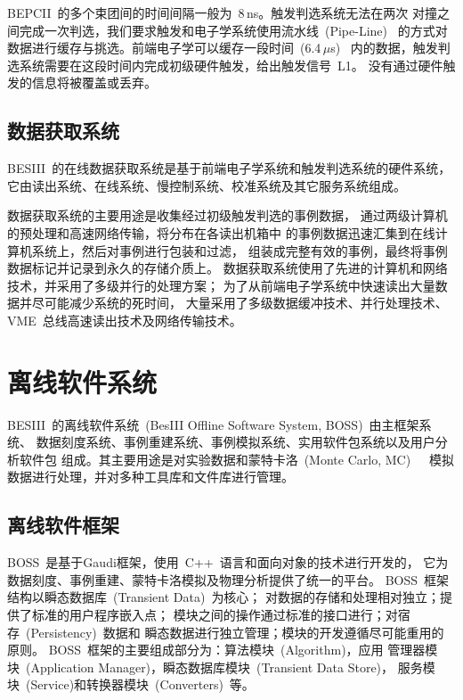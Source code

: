 BEPCII~的多个束团间的时间间隔一般为~8\,ns。触发判选系统无法在两次
对撞之间完成一次判选，我们要求触发和电子学系统使用流水线~(Pipe-Line)~
的方式对数据进行缓存与挑选。前端电子学可以缓存一段时间~(6.4\,$\mu$s)~
内的数据，触发判选系统需要在这段时间内完成初级硬件触发，给出触发信号~L1。
没有通过硬件触发的信息将被覆盖或丢弃。

\subsection{数据获取系统}
BESIII~的在线数据获取系统是基于前端电子学系统和触发判选系统的硬件系统，
它由读出系统、在线系统、慢控制系统、校准系统及其它服务系统组成。

数据获取系统的主要用途是收集经过初级触发判选的事例数据，
通过两级计算机的预处理和高速网络传输，将分布在各读出机箱中
的事例数据迅速汇集到在线计算机系统上，然后对事例进行包装和过滤，
组装成完整有效的事例，最终将事例数据标记并记录到永久的存储介质上。
数据获取系统使用了先进的计算机和网络技术，并采用了多级并行的处理方案；
为了从前端电子学系统中快速读出大量数据并尽可能减少系统的死时间，
大量采用了多级数据缓冲技术、并行处理技术、VME~总线高速读出技术及网络传输技术。

\section{离线软件系统}
BESIII~的离线软件系统~(BesIII Offline Software System, BOSS)~由主框架系统、
数据刻度系统、事例重建系统、事例模拟系统、实用软件包系统以及用户分析软件包
组成。其主要用途是对实验数据和蒙特卡洛~(Monte Carlo, MC)~\,\cite{mcsim}~
模拟数据进行处理，并对多种工具库和文件库进行管理。

\subsection{离线软件框架}
BOSS~是基于Gaudi框架，使用~C++~语言和面向对象的技术进行开发的，
它为数据刻度、事例重建、蒙特卡洛模拟及物理分析提供了统一的平台。
BOSS~框架结构以瞬态数据库~(Transient Data)~为核心；
对数据的存储和处理相对独立；提供了标准的用户程序嵌入点；
模块之间的操作通过标准的接口进行；对宿存~(Persistency)~数据和
瞬态数据进行独立管理；模块的开发遵循尽可能重用的原则。
BOSS~框架的主要组成部分为：算法模块~(Algorithm)，应用
管理器模块~(Application Manager)，瞬态数据库模块~(Transient Data Store)，
服务模块~(Service)和转换器模块~(Converters)~等。

